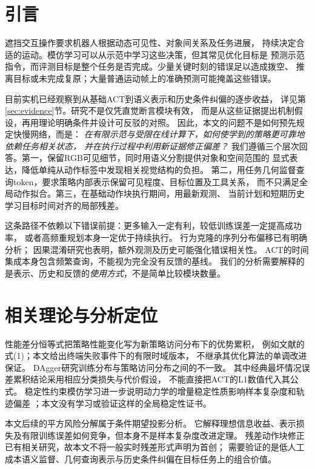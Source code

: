 \section{引言}
遮挡交互操作要求机器人根据动态可见性、对象间关系及任务进展，
持续决定合适的运动。模仿学习可以从示范中学习这些决策，但其常见优化目标是
预测示范指令，而评测目标是整个任务是否完成。少量关键时刻的错误足以造成拨空、
推离目标或未完成复原；大量普通运动帧上的准确预测可能掩盖这些错误。

目前实机已经观察到从基础ACT到语义表示和历史条件纠偏的逐步收益，
详见第\ref{sec:evidence}节。研究不是仅凭直觉断言模块有效，
而是从这些证据提出机制假设，再用理论明确条件并设计可反驳的对照。
因此，本文的问题不是如何预先规定快慢网络，而是：
\emph{在有限示范与受限在线计算下，如何使学到的策略更可靠地依赖任务相关状态，
并在执行过程中利用新证据修正偏差？}
我们遵循三个层次回答。第一，保留RGB可见细节，同时用语义分割提供对象和空间范围的
显式表达，降低单纯从动作标签中发现相关视觉结构的负担。
第二，用任务几何监督查询token，要求策略内部表示保留可见程度、目标位置及工具关系，
而不只满足全局动作拟合。第三，在基础动作块执行期间，用最新观测、
当前计划和短期历史学习目标时间对齐的局部残差。

这条路径不依赖以下错误前提：更多输入一定有利，较低训练误差一定提高成功率，
或者高频重规划本身一定优于持续执行。
行为克隆的序列分布偏移已有明确分析\cite{ross2011}；
因果混淆研究也表明，额外观测及历史可能强化错误相关性\cite{dehaan2019}。
ACT的时间集成本身包含频繁查询\cite{zhao2023act}，不能视为完全没有反馈的基线。
我们的分析需要解释的是表示、历史和反馈的\emph{使用方式}，不是简单比较模块数量。

\section{相关理论与分析定位}
性能差分恒等式把策略性能变化写为新策略访问分布下的优势累积，
例如文献\cite{schulman2015}的式(1)；本文给出终端失败事件下的有限时域版本，
不继承其优化算法的单调改进保证。
DAgger研究训练分布与策略访问分布之间的不一致\cite{ross2011}。
其中经典最坏情况误差累积结论采用相应分类损失与代价假设，
不能直接把ACT的L1数值代入其公式。
稳定性约束模仿学习进一步说明动力学的增量稳定性质影响样本复杂度和轨迹偏差
\cite{tu2022}；本文没有学习或验证这样的全局稳定性证书。

本文后续的平方风险分解属于条件期望投影分析。
它解释理想信息收益、表示损失及有限训练误差如何竞争，但本身不是样本复杂度改进定理。
残差动作块修正已有相关研究\cite{a2c2}，故本文不将一般实时残差形式声明为首创；
需要验证的是低人工成本语义监督、几何查询表示与历史条件纠偏在目标任务上的组合价值。
